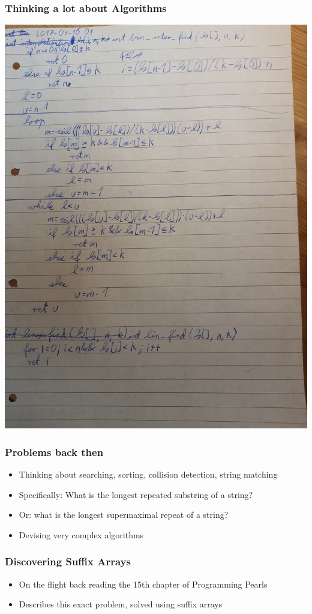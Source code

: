 \documentclass[compress,handout]{beamer} %
\begin{document}
\begin{frame}
	\frametitle{Thinking a lot about Algorithms}
	\includegraphics[width=\textwidth, height=\textheight, keepaspectratio=true]{nepal_search}
\end{frame}

\begin{frame}
	\frametitle{Problems back then}
	\begin{itemize}
		\item Thinking about searching, sorting, collision detection, string matching
		\item Specifically: What is the longest repeated substring of a string?
		\item Or: what is the longest supermaximal repeat of a string?
		\item Devising very complex algorithms
	\end{itemize}
\end{frame}

\begin{frame}
	\frametitle{Discovering Suffix Arrays}
	\begin{itemize}
		\item On the flight back reading the 15th chapter of Programming Pearls
		\item Describes this exact problem, solved using suffix arrays
	\end{itemize}
\end{frame}
\end{document}
